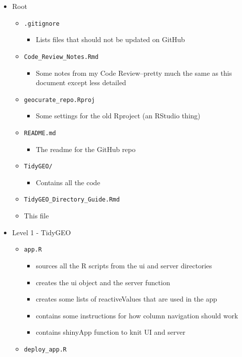 \documentclass[]{article}
\providecommand{\tightlist}{%
  \setlength{\itemsep}{0pt}\setlength{\parskip}{0pt}}
\begin{document}
\begin{itemize}
\tightlist
\item
  Root

  \begin{itemize}
  \tightlist
  \item
    \texttt{.gitignore}

    \begin{itemize}
    \tightlist
    \item
      Lists files that should not be updated on GitHub
    \end{itemize}
  \item
    \texttt{Code\_Review\_Notes.Rmd}

    \begin{itemize}
    \tightlist
    \item
      Some notes from my Code Review--pretty much the same as this
      document except less detailed
    \end{itemize}
  \item
    \texttt{geocurate\_repo.Rproj}

    \begin{itemize}
    \tightlist
    \item
      Some settings for the old Rproject (an RStudio thing)
    \end{itemize}
  \item
    \texttt{README.md}

    \begin{itemize}
    \tightlist
    \item
      The readme for the GitHub repo
    \end{itemize}
  \item
    \texttt{TidyGEO/}

    \begin{itemize}
    \tightlist
    \item
      Contains all the code
    \end{itemize}
  \item
    \texttt{TidyGEO\_Directory\_Guide.Rmd}
  \item
    This file
  \end{itemize}
\item
  Level 1 - TidyGEO

  \begin{itemize}
  \tightlist
  \item
    \texttt{app.R}

    \begin{itemize}
    \tightlist
    \item
      sources all the R scripts from the ui and server directories
    \item
      creates the ui object and the server function
    \item
      creates some lists of reactiveValues that are used in the app
    \item
      contains some instructions for how column navigation should work
    \item
      contains shinyApp function to knit UI and server
    \end{itemize}
  \item
    \texttt{deploy\_app.R}


\end{itemize}
\end{itemize}
\end{document}
